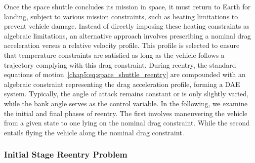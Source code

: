 Once the space shuttle concludes its mission in space, it must return to Earth for landing, subject to various mission constraints, such as heating limitations to prevent vehicle damage. Instead of directly imposing these heating constraints as algebraic limitations, an alternative approach involves prescribing a nominal drag acceleration versus a relative velocity profile. This profile is selected to ensure that temperature constraints are satisfied as long as the vehicle follows a trajectory complying with this drag constraint. During reentry, the standard equations of motion~\eqref{chap5:eq:space_shuttle_reentry} are compounded with an algebraic constraint representing the drag acceleration profile, forming a \ac{DAE} system. Typically, the angle of attack remains constant or is only slightly varied, while the bank angle serves as the control variable. In the following, we examine the initial and final phases of reentry. The first involves maneuvering the vehicle from a given state to one lying on the nominal drag constraint. While the second entails flying the vehicle along the nominal drag constraint.

\subsubsection{Initial Stage Reentry Problem}

